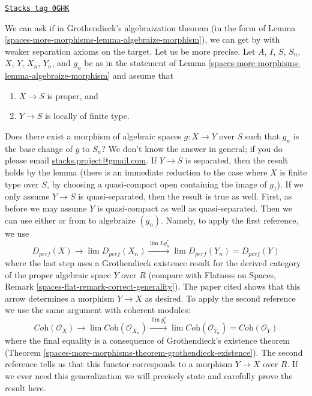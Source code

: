 \begin{remark}
\label{spaces-more-morphisms-remark-weaken-separation-axioms-question}
\href{https://stacks.math.columbia.edu/tag/0GHK}{\texttt{Stacks tag 0GHK}}

We can ask if in Grothendieck's algebraization theorem (in the form
of Lemma \ref{spaces-more-morphisms-lemma-algebraize-morphism}), we can get
by with weaker separation axioms on the target. Let us be more precise.
Let $A$, $I$, $S$, $S_n$, $X$, $Y$, $X_n$, $Y_n$, and $g_n$ be as in
the statement of Lemma \ref{spaces-more-morphisms-lemma-algebraize-morphism} and assume that
\begin{enumerate}
\item $X \to S$ is proper, and
\item $Y \to S$ is locally of finite type.
\end{enumerate}
Does there exist a morphism of algebraic spaces $g : X \to Y$
over $S$ such that $g_n$ is the base change of $g$ to $S_n$?
We don't know the answer in general; if you do please email
\href{mailto:stacks.project@gmail.com}{stacks.project@gmail.com}.
If $Y \to S$ is separated, then the result
holds by the lemma (there is an immediate reduction to the case
where $X$ is finite type over $S$, by choosing a quasi-compact
open containing the image of $g_1$). If we only assume $Y \to S$
is quasi-separated, then the result is true as well. First, as before
we may assume $Y$ is quasi-compact as well as quasi-separated.
Then we can use either \cite{Bhatt-Algebraize} or from
\cite{Hall-Rydh-coherent} to algebraize $(g_n)$. Namely, to apply
the first reference, we use
$$
D_{perf}(X) \to \lim D_{perf}(X_n)
\xrightarrow{\lim Lg_n^*}
\lim D_{perf}(Y_n) = D_{perf}(Y)
$$
where the last step uses a Grothendieck existence result for
the derived category of the proper algebraic space $Y$ over $R$
(compare with
Flatness on Spaces, Remark \ref{spaces-flat-remark-correct-generality}).
The paper cited shows that
this arrow determines a morphism $Y \to X$ as desired. To apply the
second reference we use the same argument with coherent modules:
$$
\textit{Coh}(\mathcal{O}_X) \to \lim \textit{Coh}(\mathcal{O}_{X_n})
\xrightarrow{\lim g_n^*}
\lim \textit{Coh}(\mathcal{O}_{Y_n}) = \textit{Coh}(\mathcal{O}_Y)
$$
where the final equality is a consequence of Grothendieck's
existence theorem (Theorem \ref{spaces-more-morphisms-theorem-grothendieck-existence}).
The second reference tells us that this functor corresponds to a
morphism $Y \to X$ over $R$. If we ever need this generalization
we will precisely state and carefully prove the result here.
\end{remark}

